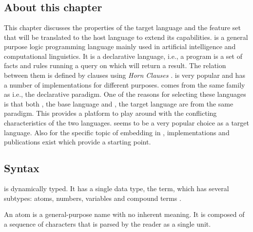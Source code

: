 \documentclass[thesis-solanki.tex]{subfiles}
\begin{document}
\chapter{}\label{chap:pwp}


\section{About this chapter}

This chapter discusses the properties of the target language  and the feature set that will be
translated to the host language to extend its capabilities.
 is a general purpose logic programming language mainly used in artificial intelligence and
computational linguistics.
It is a declarative language, i.e., a program is a set of facts and rules running a query on which will return a
result.
The relation between them is defined by clauses using \textit{Horn Clauses} \cite{wikiprolog}.
 is very popular and has a number of implementations
\cite{website:comparisonofprologimplementationswiki} for different purposes.
 comes from the same family as  i.e., the declarative paradigm.
One of the reasons for selecting these languages is that both , the base language and , the target language
are from the same paradigm.
This provides a platform to play around with the conflicting characteristics of the two languages.
 seems to be a very popular choice as a target language.
Also for the specific topic of embedding  in , implementations and publications
exist which provide a starting point.
  
\section{Syntax}

 is dynamically typed.
It has a single data type, the term, which has several subtypes: atoms, numbers, variables and compound terms
\cite{wikiprolog}.


An atom is a general-purpose name with no inherent meaning.
It is composed of a sequence of characters that is parsed by the  reader as a single unit.
\end{document}
